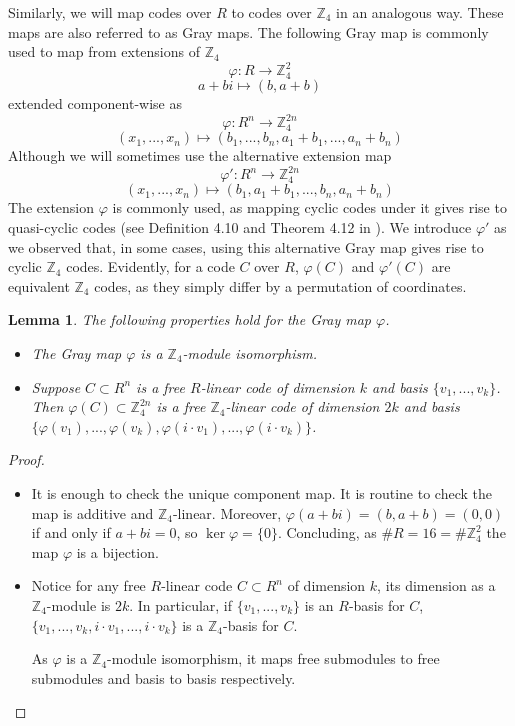 \documentclass[a4paper, 12pt]{amsart}
\newtheorem{lemma}{Lemma}[section]
\theoremstyle{definition}
\newcommand{\Z}{{\mathbb Z}}
\numberwithin{equation}{section}
\numberwithin{table}{section}
\begin{document}
Similarly, we will map codes over $R$ to codes over $\Z_4$ in an analogous way. These maps are also referred to as Gray maps. The following Gray map is commonly used to map from extensions of $\Z_4$ \cite{Aydin2024}
\[\varphi:R \to \Z_4^2\]
\[a+bi \mapsto (b,a+b)\]
extended component-wise as
\[\varphi:R^n \to \Z_4^{2n}\]
\[(x_1,...,x_n) \mapsto (b_1,...,b_n,a_1+b_1,...,a_n+b_n)\]
Although we will sometimes use the alternative extension map
\[\varphi':R^n \to \Z_4^{2n}\]
\[(x_1,...,x_n) \mapsto (b_1,a_1+b_1,...,b_n,a_n+b_n)\]
The extension $\varphi$ is commonly used, as mapping cyclic codes under it gives rise to quasi-cyclic codes (see Definition 4.10 and Theorem 4.12 in \cite{Aydin2024}). We introduce $\varphi'$ as we observed that, in some cases, using this alternative Gray map gives rise to cyclic $\Z_4$ codes. Evidently, for a code $C$ over $R$, $\varphi(C)$ and $\varphi'(C)$ are equivalent $\Z_4$ codes, as they simply differ by a permutation of coordinates.


\begin{lemma}\label{grayproperties}
The following properties hold for the Gray map $\varphi$.
\begin{itemize}
    \item The Gray map $\varphi$ is a $\Z_4$-module isomorphism.
    \item Suppose $C\subset R^n$ is a free $R$-linear code of dimension $k$ and basis $\{v_1,...,v_k\}$. Then $\varphi(C)\subset \Z_4^{2n}$ is a free $\Z_4$-linear code of dimension $2k$ and basis \\
    $\{\varphi(v_1),...,\varphi(v_k),\varphi(i\cdot v_1),...,\varphi(i \cdot v_k)\}$.
\end{itemize}
    
\end{lemma}

\begin{proof}
    \leavevmode
    \begin{itemize}
    
    \item It is enough to check the unique component map. It is routine to check the map is additive and $\Z_4$-linear.
    Moreover, $\varphi(a+bi) = (b,a+b)=(0,0)$ if and only if $a+bi=0$, so $\ker\varphi = \{0\}$. Concluding, as $\#R =16 = \#\Z_4^2$ the map $\varphi$ is a bijection.

    \item Notice for any free $R$-linear code $C\subset R^n$ of dimension $k$, its dimension as a $\Z_4$-module is $2k$. In particular, if  $\{v_1,...,v_k\}$ is an $R$-basis for $C$, $\{v_1,...,v_k,i\cdot v_1,...,i \cdot v_k\}$ is a $\Z_4$-basis for $C$.

    As $\varphi$ is a $\Z_4$-module isomorphism, it maps free submodules to free submodules and basis to basis respectively.
    \end{itemize}
    
    
    
\end{proof}
\end{document}
